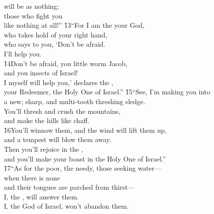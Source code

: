 \begin{poetry}
\poemll    will be as nothing; \\
\poeml those who fight you \\
\poemll    like nothing at all!''
\poeml \v{13}``For I am the  your God, \\
\poemll    who takes hold of your right hand, \\
\poeml who says to you, `Don't be afraid. \\
\poemll    I'll help you. \\
\poeml \v{14}Don't be afraid, you little worm Jacob, \\
\poemll    and you insects of Israel! \\
\poeml I myself will help you,' declares the , \\
\poemll    your Redeemer, the Holy One of Israel.''
\poeml \v{15}``See, I'm making you into \\
\poemll    a new, sharp, and multi-tooth threshing sledge. \\
\poeml You'll thresh and crush the mountains, \\
\poemll    and make the hills like chaff. \\
\poeml \v{16}You'll winnow them, and the wind will lift them up, \\
\poemll    and a tempest will blow them away. \\
\poeml Then you'll rejoice in the , \\
\poemll    and you'll make your boast in the Holy One of Israel.'' \\
\poeml \v{17}``As for the poor, the needy, those seeking water--- \\
\poemll    when there is none \\
\poemlll       and their tongues are parched from thirst--- \\
\poeml I, the , will answer them. \\
\poemll    I, the God of Israel, won't abandon them. \\

\end{poetry}
